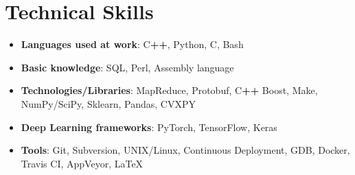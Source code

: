 \documentclass[letterpaper,11pt]{article}
\newcommand{\resumeItem}[2]{
    \item\small{
        \textbf{#1}{: #2 \vspace{-2pt}}
    }
}
\newcommand{\resumeSubItem}[2]{\resumeItem{#1}{#2}\vspace{-4pt}}
\newcommand{\resumeSubHeadingListStart}{\begin{itemize}[leftmargin=*]}
\newcommand{\resumeSubHeadingListEnd}{\end{itemize}}
\begin{document}
\vspace{-20pt}
\section{Technical Skills}
\resumeSubHeadingListStart
    \resumeSubItem{Languages used at work}{C\textbf{\footnotesize++}, Python, C, Bash}
    \resumeSubItem{Basic knowledge}{SQL, Perl, Assembly language}
    \resumeSubItem{Technologies/Libraries}{MapReduce, Protobuf, C\textbf{\footnotesize++} Boost, Make, NumPy/SciPy, Sklearn, Pandas, CVXPY}
    \resumeSubItem{Deep Learning frameworks}{PyTorch, TensorFlow, Keras}
    \resumeSubItem{Tools}{Git, Subversion, UNIX/Linux, Continuous Deployment, GDB, Docker, Travis CI, AppVeyor, \LaTeX}
\resumeSubHeadingListEnd

\end{document}
